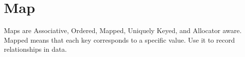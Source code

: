 \section{Map}
Maps are Associative, Ordered, Mapped, Uniquely Keyed, and Allocator aware\cite{cplusplus}.  Mapped means that each key corresponds to a specific value. Use it to record relationships in data.
